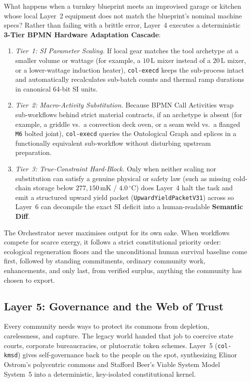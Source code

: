 What happens when a turnkey blueprint meets an improvised garage or kitchen whose local Layer~2 equipment does not match the blueprint's nominal machine specs? Rather than failing with a brittle error, Layer~4 executes a deterministic \textbf{3-Tier BPMN Hardware Adaptation Cascade}:
\begin{enumerate}
  \item \textit{Tier~1: SI Parameter Scaling.} If local gear matches the tool archetype at a smaller volume or wattage (for example, a $10\,\mathrm{L}$ mixer instead of a $20\,\mathrm{L}$ mixer, or a lower-wattage induction heater), \texttt{col-execd} keeps the sub-process intact and automatically recalculates sub-batch counts and thermal ramp durations in canonical 64-bit SI units.
  \item \textit{Tier~2: Macro-Activity Substitution.} Because BPMN Call Activities wrap sub-workflows behind strict material contracts, if an archetype is absent (for example, a griddle vs.\ a convection deck oven, or a seam weld vs.\ a flanged \texttt{M6} bolted joint), \texttt{col-execd} queries the Ontological Graph and splices in a functionally equivalent sub-workflow without disturbing upstream preparation.
  \item \textit{Tier~3: True-Constraint Hard-Block.} Only when neither scaling nor substitution can satisfy a genuine physical or safety law (such as missing cold-chain storage below $277{,}150\,\mathrm{mK}$ / $4.0\,^\circ\mathrm{C}$) does Layer~4 halt the task and emit a structured upward yield packet (\texttt{UpwardYieldPacketV31}) across  so Layer~6 can decompile the exact SI deficit into a human-readable \textbf{Semantic Diff}.
\end{enumerate}

The Orchestrator never maximises output for its own sake. When workflows compete for scarce exergy, it follows a strict constitutional priority order: ecological regeneration floors and the unconditional human survival baseline come first, followed by standing commitments, ordinary community work, enhancements, and only last, from verified surplus, anything the community has chosen to export.

\subsection{Layer 5: Governance and the Web of Trust}

Every community needs ways to protect its commons from depletion, carelessness, and capture. The legacy world handed that job to coercive state courts, corporate bureaucracies, or plutocratic token schemes. Layer~5 (\texttt{col-kmsd}) gives self-governance back to the people on the spot, synthesizing Elinor Ostrom's polycentric commons \parencite{ostrom1990,ostrom2010} and Stafford Beer's Viable System Model System~5 \parencite{beer1972,beer1979} into a deterministic, key-isolated constitutional kernel.

